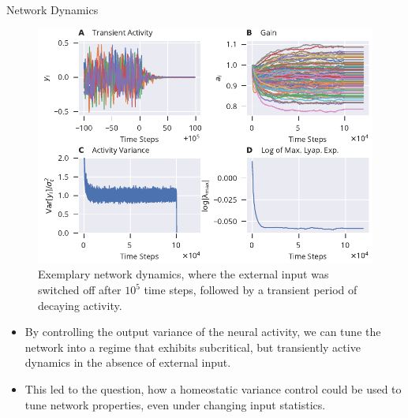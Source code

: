 \documentclass{beamer}
\begin{document}
\begin{frame}[t]
\begin{columns}[t]
\begin{column}{.4\textwidth}
\begin{myblock}{Network Dynamics}
	\begin{figure}
		\includegraphics[width=\textwidth]{../figures/res_comp.pdf}
		\caption{Exemplary network dynamics, where the external input was switched off after $10^5$ time steps, followed by a transient period of decaying activity.}
		\label{fig:trans_dyn}
	\end{figure}
	\begin{itemize}
		\item By controlling the output variance of the neural activity, we can tune the network into a regime that exhibits subcritical, but transiently active dynamics in the absence of external input.
		\item This led to the question, how a homeostatic variance control could be used to tune network properties, even under changing input statistics. 
	\end{itemize}
\end{myblock}

\end{column}


\end{columns}
\end{frame}
\end{document}
